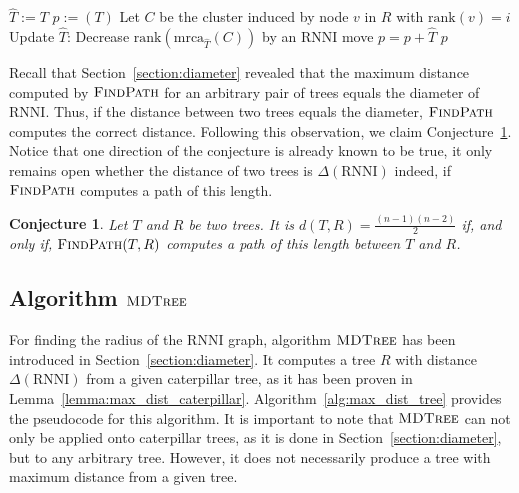 \documentclass{amsart}
\newcommand{\mrca}{\mathrm{mrca}}
\newcommand{\rank}{\mathrm{rank}}
\newcommand{\rnni}{\mathrm{RNNI}}
\newcommand{\findpath}{\textsc{FindPath}}
\newcommand{\mdtree}{\textsc{MDTree}}
\newtheorem{conjecture}[definition]{Conjecture}
\begin{document}
\begin{algorithm}[H]
\caption{$\findpath$($T,R$)}
\label{alg:find_path}
\begin{algorithmic}[1]
	\STATE $\hat{T} := T$
	\STATE $p := (T)$
		\STATE Let $C$ be the cluster induced by node $v$ in $R$ with $\rank(v) = i$
		\WHILE {$\rank(\mrca_{\hat{T}}(C))>i$}
			\STATE Update $\hat{T}$: Decrease $\rank(\mrca_{\hat{T}}(C))$ by an $\rnni$ move \label{alg:line:move_set_down}
			\STATE $p = p+\hat{T}$
		\ENDWHILE
	\ENDFOR
	\RETURN $p$
\end{algorithmic}
\end{algorithm}

Recall that Section~\ref{section:diameter} revealed that the maximum distance computed by $\findpath$ for an arbitrary pair of trees equals the diameter of $\rnni$.
Thus, if the distance between two trees equals the diameter, $\findpath$ computes the correct distance.
Following this observation, we claim Conjecture~\ref{conjecture:findpath_maxdist_correct}.
Notice that one direction of the conjecture is already known to be true, it only remains open whether the distance of two trees is $\Delta(\rnni)$ indeed, if $\findpath$ computes a path of this length.

\begin{conjecture}
    Let $T$ and $R$ be two trees.
    It is $d(T,R) = \frac{(n-1)(n-2)}{2}$ if, and only if, $\findpath(T,R)$ computes a path of this length between $T$ and $R$.
    \label{conjecture:findpath_maxdist_correct}
\end{conjecture}

\subsection{Algorithm $\mdtree$}
\label{section:computation_mdtree}

For finding the radius of the $\rnni$ graph, algorithm $\mdtree$ has been introduced in Section~\ref{section:diameter}.
It computes a tree $R$ with distance $\Delta(\rnni)$ from a given caterpillar tree, as it has been proven in Lemma~\ref{lemma:max_dist_caterpillar}.
Algorithm~\ref{alg:max_dist_tree} provides the pseudocode for this algorithm.
It is important to note that $\mdtree$ can not only be applied onto caterpillar trees, as it is done in Section~\ref{section:diameter}, but to any arbitrary tree.
However, it does not necessarily produce a tree with maximum distance from a given tree.

\end{document}
